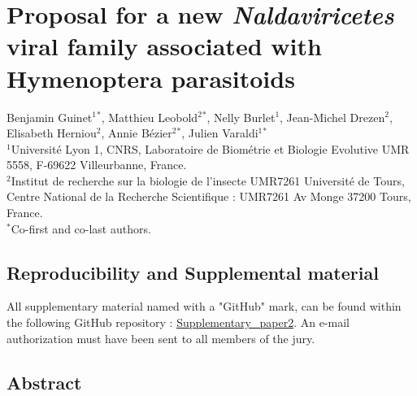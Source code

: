 \chapter{Proposal for a new \textit{\textit{Naldaviricetes}} viral family associated with Hymenoptera parasitoids}
    \label{chap:LbFV-Family-description}
    
        \begin{center}
        \Large Benjamin Guinet$^{\text{1}}$$^{\text{*}}$, Matthieu Leobold$^{\text{2}}$$^{\text{*}}$, Nelly Burlet$^{\text{1}}$, Jean-Michel Drezen$^{\text{2}}$, Elisabeth Herniou$^{\text{2}}$, Annie Bézier$^{\text{2}}$$^{\text{*}}$, Julien Varaldi$^{\text{1}}$$^{\text{*}}$\\
        \vspace{0.5cm}
        \normalsize
        $^{\text{1}}${Université Lyon 1, CNRS, Laboratoire de Biométrie et Biologie Evolutive UMR 5558, F-69622 Villeurbanne, France.}\\
        $^{\text{2}}${Institut de recherche sur la biologie de l'insecte UMR7261 Université de Tours, Centre National de la Recherche Scientifique : UMR7261 Av Monge 37200 Tours, France.}\\
        $^{\text{*}}${Co-first and co-last authors.}\\
    \end{center}
     \setcounter{minitocdepth}{1}

    {\hypersetup{linkcolor=GREYDARK}\minitoc}

\clearpage

\label{sec:chap2}

\section{Reproducibility and Supplemental material}

All supplementary material named with a "GitHub" mark, can be found within the following GitHub repository : \href{https://github.com/BenjaminGuinet/PhD_defense/tree/main/Supplementary_paper2}{Supplementary\_paper2}. An e-mail authorization must have been sent to all members of the jury.

\section{Abstract}


